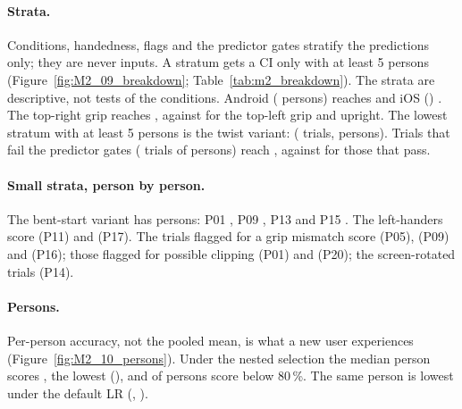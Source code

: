 \paragraph{Strata.} Conditions, handedness, flags and the predictor gates stratify the predictions only; they
are never inputs. A stratum gets a CI only with at least 5 persons (Figure~\ref{fig:M2_09_breakdown};
Table~\ref{tab:m2_breakdown}). The strata are descriptive, not tests of the conditions. Android
( persons) reaches  and iOS
() . The top-right grip reaches
, against 
for the top-left grip and  upright. The lowest stratum with at
least 5 persons is the twist variant: 
( trials,  persons). Trials that fail the
predictor gates ( trials of  persons)
reach , against  for those that pass.

\paragraph{Small strata, person by person.} The bent-start variant has  persons: P01
, P09 , P13
 and P15 . The left-handers
score  (P11) and  (P17). The trials
flagged for a grip mismatch score  (P05),
 (P09) and  (P16); those
flagged for possible clipping  (P01) and
 (P20); the screen-rotated trials
 (P14).

\paragraph{Persons.} Per-person accuracy, not the pooled mean, is what a new user experiences
(Figure~\ref{fig:M2_10_persons}). Under the nested selection the median person scores
, the lowest  (), and
 of  persons score below 80\,\%. The same person is lowest under the
default LR (, ).

